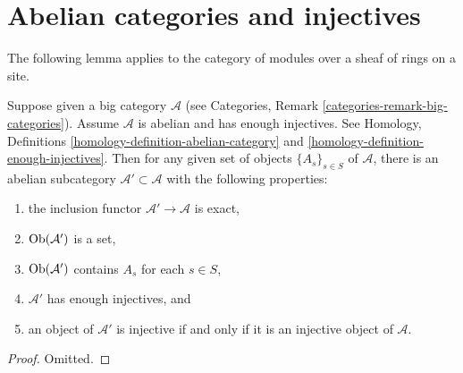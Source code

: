\section{Abelian categories and injectives}
\label{section-abelian-categories-injectives}

\noindent
The following lemma applies to the category of modules over a sheaf
of rings on a site.

\begin{lemma}
\label{lemma-abelian-injectives}
Suppose given a big category $\mathcal{A}$ (see
Categories, Remark \ref{categories-remark-big-categories}).
Assume $\mathcal{A}$ is abelian and has enough injectives.
See Homology, Definitions \ref{homology-definition-abelian-category}
and \ref{homology-definition-enough-injectives}.
Then for any given set of objects $\{A_s\}_{s\in S}$
of $\mathcal{A}$, there is an abelian subcategory
$\mathcal{A}' \subset \mathcal{A}$
with the following properties:
\begin{enumerate}
\item the inclusion functor $\mathcal{A}' \to \mathcal{A}$ is exact,
\item $\mathop{\mathrm{Ob}}\nolimits(\mathcal{A}')$ is a set,
\item $\mathop{\mathrm{Ob}}\nolimits(\mathcal{A}')$ contains $A_s$ for each $s \in S$,
\item $\mathcal{A}'$ has enough injectives, and
\item an object of $\mathcal{A}'$ is injective if and only if it
is an injective object of $\mathcal{A}$.
\end{enumerate}
\end{lemma}

\begin{proof}
Omitted.
\end{proof}
















